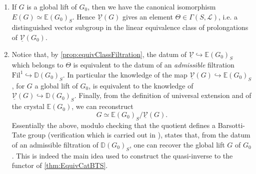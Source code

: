 \begin{rem}[]
\begin{enumerate}
	\item If $G$ is a global lift of $G_0$, then we have the canonical isomorphism
		$E(G) \simeq \mathbb{E}(G_0)_S$.
		Hence $\underline{\mathcal{V}}(G)$ gives an element $\Theta \in \Gamma(S,\mathscr{L})$,
		i.e. a distinguished vector subgroup in the linear equivalence
		class of prolongations of $\underline{\mathcal{V}}(G_0)$.

	\item Notice that, by \cref{prop:equivClassFiltration}, the datum of 
		$\underline{\mathcal{V}} \hookrightarrow \mathbb{E}(G_0)_S$
		which belongs to $\Theta$ is
		equivalent to the datum of an \emph{admissible} filtration
		$\mathrm{Fil}^1 \hookrightarrow \mathbb{D}(G_0)_S$.
		In particular the knowledge of the map
		$\underline{\mathcal{V}}(G) \hookrightarrow \mathbb{E}(G_0)_S$, for $G$ a global
		lift of $G_0$, is equivalent to the knowledge of
		$\underline{\mathcal{V}}(G) \hookrightarrow \mathbb{D}(G_0)_S$.
		Finally, from the definition of universal extension
		and of the crystal $\mathbb{E}(G_0)$, we can reconstruct 
		\begin{equation*}
			G \simeq \mathbb{E}(G_0)_S/\underline{\mathcal{V}}(G)
		.\end{equation*}
		Essentially the above, modulo checking that the quotient defines
		a Barsotti-Tate group (verification which is carried out in
		\cite[Chapter V, theorem 1.6]{Messing}), states that, from 
		the datum of an admissible filtration of $\mathbb{D}(G_0)_S$,
		one can recover the global lift $G$ of $G_0$.
		This is indeed the main idea used to construct the quasi-inverse
		to the functor of \cref{thm:EquivCatBTS}.
\end{enumerate}
\end{rem}

